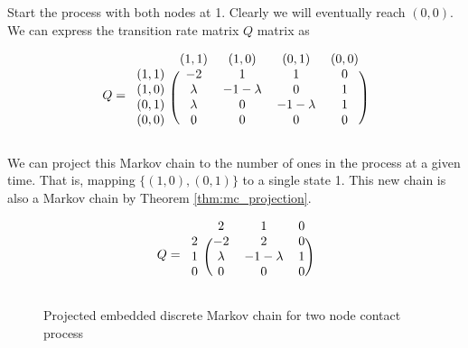 \documentclass{article}
\theoremstyle{plain}
\theoremstyle{definition}
\theoremstyle{remark}
\begin{document}
Start the process with both nodes at 1.
Clearly we will eventually reach $(0,0)$.
We can express the transition rate matrix $Q$ matrix as

$$
Q = \begin{blockarray}{ccccc}
    & (1,1) & (1,0) & (0,1) & (0,0)\\
    \begin{block}{c(cccc)}
        (1,1) & -2 & 1 & 1 & 0\\
        (1,0) & \lambda & - 1 - \lambda & 0 & 1\\
        (0,1) & \lambda & 0 & - 1 - \lambda & 1\\
        (0,0) & 0 & 0 & 0 & 0\\
    \end{block}
\end{blockarray}
$$

We can project this Markov chain to the number of ones in the process at a given time.
That is, mapping $\{(1,0),(0,1)\}$ to a single state 1.
This new chain is also a Markov chain by Theorem \ref{thm:mc_projection}.

$$
Q = \begin{blockarray}{cccc}
    & 2 & 1 & 0\\
    \begin{block}{c(ccc)}
        2 & -2 & 2 & 0\\
        1 & \lambda & - 1 - \lambda & 1\\
        0 & 0 & 0 & 0\\
    \end{block}
\end{blockarray}
$$

\begin{figure}
    \centering
    \caption{Projected embedded discrete Markov chain for two node contact process}
    \label{fig:discrete_mc_two_contact}
\end{figure}
\end{document}

